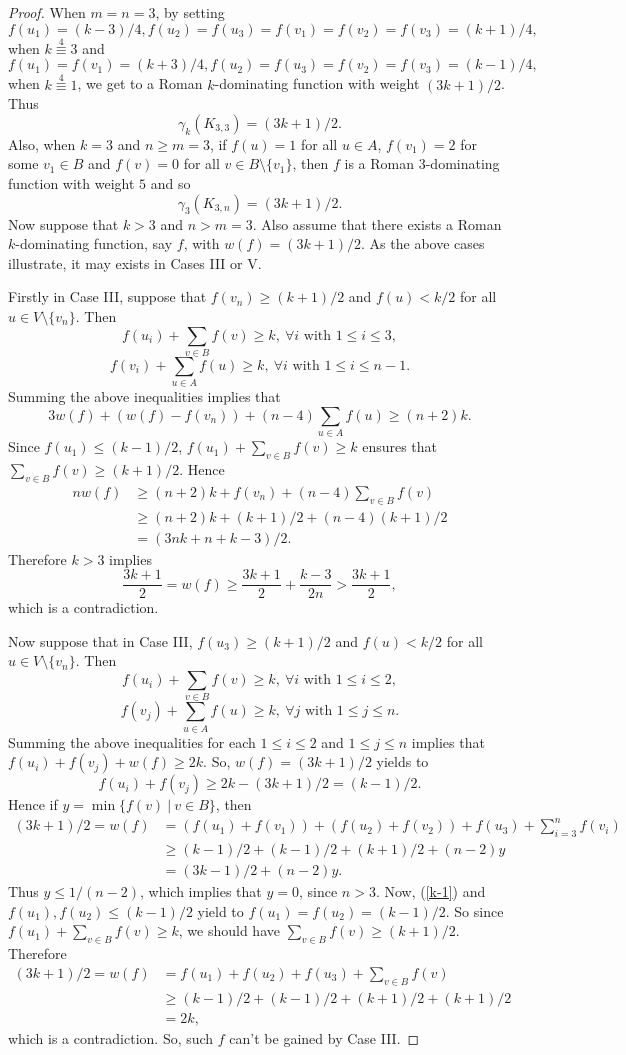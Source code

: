 \documentclass[12pt]{amsart}
\begin{document}
\begin{proof}
When $m=n=3$, by setting
 $$f(u_1)=(k-3)/4, f(u_2)=f(u_3)=f(v_1)=f(v_2)=f(v_3)=(k+1)/4,$$
 when $k\overset{4}{\equiv} 3$  and 
$$f(u_1)=f(v_1)=(k+3)/4, f(u_2)=f(u_3)=f(v_2)=f(v_3)=(k-1)/4,$$
 when $k\overset{4}{\equiv}1$,  we get to a Roman $k$-dominating function with weight $(3k+1)/2$. Thus 
$$\gamma_k(K_{3,3})=(3k+1)/2.$$
Also, when $k=3$ and $n\geq m=3$, if $f(u)=1$ for all $u\in A$, $f(v_1)=2$ for some $v_1\in B$ and $f(v)=0$ for all $v\in B\setminus \{v_1\}$, then $f$ is a Roman $3$-dominating function with weight $5$ and so 
$$\gamma_3(K_{3,n})=(3k+1)/2.$$
Now suppose that $k>3$ and $n>m=3$. Also assume that there exists a Roman $k$-dominating function, say $f$, with $w(f)=(3k+1)/2$. As the above cases illustrate, it may exists in Cases III or V. 

Firstly in Case III, suppose that $f(v_n)\geq (k+1)/2$ and $f(u)<k/2$ for all $u\in V\setminus \{v_n\}$. Then
$$f(u_i)+\sum_{v\in B}f(v)\geq k, \ \forall i \textrm{ with }   1\leq i \leq 3, $$
$$f(v_i)+\sum_{u\in A}f(u)\geq k, \ \forall i \textrm{ with }   1\leq i \leq n-1.$$
Summing the above inequalities implies that
$$3w(f)+(w(f)-f(v_n))+(n-4)\sum_{u\in A}f(u)\geq (n+2)k.$$
Since $f(u_1)\leq (k-1)/2$, $f(u_1)+\sum_{v\in B}f(v)\geq k$ ensures that $\sum_{v\in B}f(v)\geq (k+1)/2$. Hence
\begin{align*}
nw(f)&\geq (n+2)k+f(v_n)+(n-4)\sum_{v\in B}f(v)\\
&\geq (n+2)k+(k+1)/2+(n-4)(k+1)/2\\
&=(3nk+n+k-3)/2.
\end{align*}
Therefore $k>3$ implies
$$\frac{3k+1}{2}=w(f)\geq \frac{3k+1}{2}+\frac{k-3}{2n}> \frac{3k+1}{2},$$
which is a contradiction.

Now suppose that in Case III, $f(u_3)\geq (k+1)/2$ and $f(u)<k/2$ for all $u\in V\setminus \{v_n\}$. Then
$$f(u_i)+\sum_{v\in B}f(v)\geq k, \ \forall i \textrm{ with }   1\leq i \leq 2, $$
$$f(v_j)+\sum_{u\in A}f(u)\geq k, \ \forall j \textrm{ with }   1\leq j \leq n.$$
Summing the above inequalities for each $1\leq i \leq 2$ and $1\leq j \leq n$ implies that $f(u_i)+f(v_j)+w(f)\geq 2k$. So, $w(f)=(3k+1)/2$ yields to
\begin{equation}\label{k-1}
f(u_i)+f(v_j)\geq 2k-(3k+1)/2=(k-1)/2. 
\end{equation}
Hence if $y=\min\{f(v) \ | \ v\in B\}$, then
\begin{align*}
(3k+1)/2=w(f)&=(f(u_1)+f(v_1))+(f(u_2)+f(v_2))+f(u_3)+\sum_{i=3}^nf(v_i)\\
&\geq (k-1)/2+(k-1)/2+(k+1)/2+(n-2)y\\
&=(3k-1)/2+(n-2)y.
\end{align*}
Thus $y\leq 1/(n-2)$, which implies that $y=0$, since $n>3$. Now, (\ref{k-1}) and $f(u_1), f(u_2)\leq (k-1)/2$ yield to $f(u_1)=f(u_2)=(k-1)/2$. So since $f(u_1)+\sum_{v\in B}f(v)\geq k$, we should have $\sum_{v\in B}f(v)\geq (k+1)/2$. Therefore
\begin{align*}
(3k+1)/2=w(f)&=f(u_1)+f(u_2)+f(u_3)+\sum_{v\in B}f(v)\\
&\geq (k-1)/2+(k-1)/2+(k+1)/2+(k+1)/2\\
&=2k,
\end{align*}
which is a contradiction. So, such $f$ can't be gained by Case III.


\end{proof}
\end{document}
